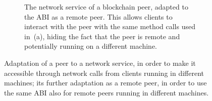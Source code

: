 \begin{figure}
\begin{subfigure}[b]{0.3\textwidth}
    \caption{The network service of a blockchain peer, adapted to the
      ABI as a remote peer. This allows clients
      to interact with the peer with the same method calls used
      in~(a), hiding the fact that the peer
      is remote and potentially running on a different machine.}
    \label{fig:remote_peer}
  \end{subfigure}
  \caption{Adaptation of a peer to a network service, in order to make it accessible
    through network calls from clients running in different machines; its further
    adaptation as a remote peer, in order to use the same
    ABI also for remote peers running in different machines.}
\end{figure}

